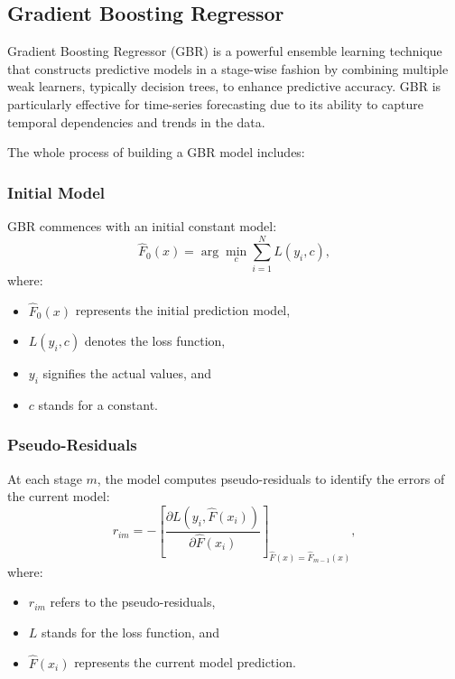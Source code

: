 \documentclass{ieeeojies}
\begin{document}
\subsection{Gradient Boosting Regressor}

Gradient Boosting Regressor (GBR) is a powerful ensemble learning technique that constructs predictive models in a stage-wise fashion by combining multiple weak learners, typically decision trees, to enhance predictive accuracy. GBR is particularly effective for time-series forecasting due to its ability to capture temporal dependencies and trends in the data.

The whole process of building a GBR model includes:
\subsubsection{Initial Model}

GBR commences with an initial constant model:
\begin{equation}
    \hat{F}_0(x) = \arg\min_{c} \sum_{i=1}^{N} L(y_i, c),
\end{equation}
where:
\begin{itemize}
    \item \(\hat{F}_0(x)\) represents the initial prediction model,
    \item \(L(y_i, c)\) denotes the loss function,
    \item \(y_i\) signifies the actual values, and
    \item \(c\) stands for a constant.
\end{itemize}

\subsubsection{Pseudo-Residuals}

At each stage \(m\), the model computes pseudo-residuals to identify the errors of the current model:
\begin{equation}
    r_{im} = -\left[\frac{\partial L(y_i, \hat{F}(x_i))}{\partial \hat{F}(x_i)}\right]_{\hat{F}(x) = \hat{F}_{m-1}(x)},
\end{equation}
where:
\begin{itemize}
    \item \(r_{im}\) refers to the pseudo-residuals,
    \item \(L\) stands for the loss function, and
    \item \(\hat{F}(x_i)\) represents the current model prediction.
\end{itemize}
\end{document}
